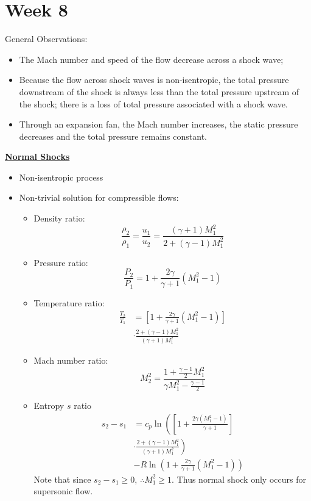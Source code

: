 \section{Week 8}
General Observations:
\begin{itemize}
    \item The Mach number and speed of the flow decrease across a shock wave;
    \item Because the flow across shock waves is non-isentropic, the total pressure downstream of the shock is always less than the total pressure upstream of the shock; there is a loss of total pressure associated with a shock wave.
    \item Through an expansion fan, the Mach number increases, the static pressure decreases and the total pressure remains constant.
\end{itemize}
\Large \textbf{{\color{red}\underline{Normal Shocks}}}

\begin{itemize}
    \item Non-isentropic process
    \item Non-trivial solution for {\color{blue}compressible} flows:
    \begin{itemize}
        \item Density ratio:
        \begin{equation*}
            \frac{\rho_2}{\rho_1} = \frac{u_1}{u_2} = \frac{(\gamma + 1)M_1^2}{2+(\gamma - 1)M_1^2}
        \end{equation*}
        \item Pressure ratio:
        \begin{equation*}
            \frac{P_2}{P_1} = 1 + \frac{2 \gamma}{\gamma + 1} (M_1^2 - 1)
        \end{equation*}
        \item Temperature ratio:
        \begin{align*}
            \frac{T_2}{T_1} &= \left[ 1 + \frac{2\gamma}{\gamma + 1}(M_1^2 - 1) \right]\\
            &\cdot \frac{2+(\gamma - 1)M_1^2}{(\gamma + 1)M_1^2}
        \end{align*}
        \item Mach number ratio:
        \begin{equation*}
            M_2^2 = \frac{1+\frac{\gamma - 1}{2}M_1^2}{\gamma M_1^2 - \frac{\gamma - 1}{2}}
        \end{equation*}
        \item Entropy $s$ ratio
        \begin{align*}
            s_2 - s_1 &= c_p \ln\left(\left[1+\frac{2\gamma(M_1^2 - 1)}{\gamma+1}\right]\right. \\
            &\cdot \left. \frac{2+(\gamma-1)M_1^2}{(\gamma + 1)M_1^2}\right) \\
            &- R \ln\left( 1 + \frac{2\gamma}{\gamma + 1}(M_1^2 - 1) \right)
        \end{align*}
        Note that since $s_2 - s_1 \geq 0$, $\therefore M_1^2\geq 1$. Thus normal shock only occurs for supersonic flow.
    \end{itemize}
\end{itemize}

